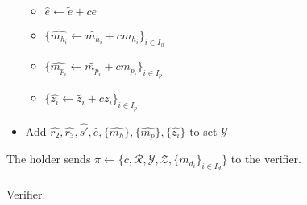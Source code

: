 \documentclass[a4paper]{article}
\begin{document}
\begin{itemize}
\begin{itemize}
        \item $\widehat{e} \leftarrow \widetilde{e} + c e$
        \item $\{\widehat{m_{h_i}} \leftarrow \widetilde{m_{h_i}} + c m_{h_i}\}_{i \in I_h}$
        \item $\{\widehat{m_{p_i}} \leftarrow \widetilde{m_{p_i}} + c m_{p_i}\}_{i \in I_p}$
        \item $\{\widehat{z_i} \leftarrow \widetilde{z_i} + cz_i\}_{i \in I_p}$
        \end{itemize}
    \item Add $\widehat{r_2},\widehat{r_3},\widehat{s'},\widehat{e},\{\widehat{m_h}\},\{\widehat{m_p}\},\{\widehat{z_i}\}$ to set $\mathcal{Y}$
\end{itemize}
The holder sends $\pi \leftarrow \{c, \mathcal{R}, \mathcal{Y}, \mathcal{Z}, \{m_{d_i}\}_{i \in I_d}\}$ to the verifier.\\\\
Verifier:
\end{document}

